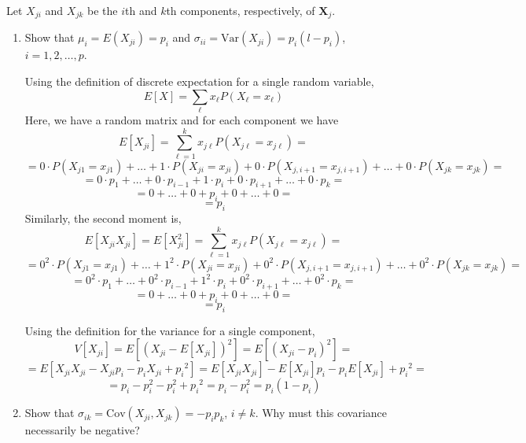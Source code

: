 Let $X_{ji}$ and $X_{jk}$ be the $i$th and $k$th components, respectively, of $\textbf{X}_{j}$.
\begin{enumerate}[label= (\alph*)]
    \item Show that $\mu_{i} = E(X_{ji}) = p_{i}$ and $\sigma_{ii} = \text{Var}(X_{ji}) = p_{i}(l - p_{i})$, $i = 1, 2, \dots, p$.
    
    Using the definition of discrete expectation for a single random variable,
    \[
        E[X] = \sum_{\ell}x_{\ell}P(X_{\ell} = x_{\ell})
    \]
    Here, we have a random matrix and for each component we have
    \[
        E[X_{ji}]
        =
        \sum_{\ell=1}^{k}x_{j\ell}P(X_{j\ell} = x_{j\ell})
        =
    \]
    \[{\scriptstyle 
        =
        0 \cdot P(X_{j1} = x_{j1}) + \dots + 1 \cdot P(X_{ji} = x_{ji}) + 0 \cdot P(X_{j,i+1} = x_{j,i+1}) + \dots + 0 \cdot P(X_{jk} = x_{jk})
        =
    }
    \]
    \[
        =
        0 \cdot p_{1} + \dots + 0 \cdot p_{i-1} + 1 \cdot p_{i} + 0 \cdot p_{i+1} + \dots + 0 \cdot p_{k}
        =
    \]
    \[
        =
        0 + \dots + 0 + p_{i} + 0 + \dots + 0
        =
    \]
    \[
        =
        p_{i}
    \]
    Similarly, the second moment is,
    \[
        E[X_{ji}X_{ji}]
        =
        E[X_{ji}^{2}]
        =
        \sum_{\ell=1}^{k}x_{j\ell}P(X_{j\ell} = x_{j\ell})
        =
    \]
    \[{\scriptstyle 
        =
        0^{2} \cdot P(X_{j1} = x_{j1}) + \dots + 1^{2} \cdot P(X_{ji} = x_{ji}) + 0^{2} \cdot P(X_{j,i+1} = x_{j,i+1}) + \dots + 0^{2} \cdot P(X_{jk} = x_{jk})
        =
    }
    \]
    \[
        =
        0^{2} \cdot p_{1} + \dots + 0^{2} \cdot p_{i-1} + 1^{2} \cdot p_{i} + 0^{2} \cdot p_{i+1} + \dots + 0^{2} \cdot p_{k}
        =
    \]
    \[
        =
        0 + \dots + 0 + p_{i} + 0 + \dots + 0
        =
    \]
    \[
        =
        p_{i}
    \]

    Using the definition for the variance for a single component,
    \[
        V[X_{ji}]
        =
        E[{(X_{ji}-E[X_{ji}])}^{2}]
        =
        E[{(X_{ji}-p_{i})}^{2}]
        =
    \]
    \[
        =
        E[X_{ji}X_{ji} - X_{ji}p_{i} - p_{i}X_{ji} + {p_{i}}^{2}]
        =
        E[X_{ji}X_{ji}] - E[X_{ji}]p_{i} - p_{i}E[X_{ji}] + {p_{i}}^{2}
        =
    \]
    \[
        =
        p_{i} - p_{i}^{2} - p_{i}^{2} + {p_{i}}^{2}
        =
        p_{i} - p_{i}^{2}
        =
        p_{i}(1 - p_{i})
    \]
    \item Show that $\sigma_{ik} = \text{Cov}(X_{ji}, X_{jk}) = - p_{i}p_{k}$, $i \ne k$. Why must this covariance necessarily be negative?
    

\end{enumerate}
